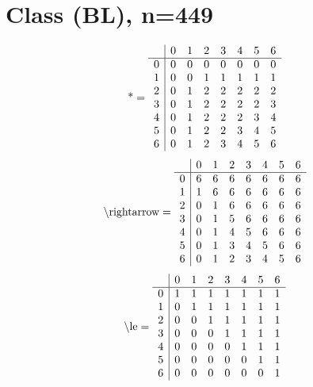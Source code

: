 \documentclass[11pt]{article}
\begin{document}
\section{Class (BL), n=449}
\[\text{*} = 
\begin{array}{r | r r r r r r r}
 & 0 & 1 & 2 & 3 & 4 & 5 & 6 \\ \hline
0 & 0 & 0 & 0 & 0 & 0 & 0 & 0 \\
1 & 0 & 0 & 1 & 1 & 1 & 1 & 1 \\
2 & 0 & 1 & 2 & 2 & 2 & 2 & 2 \\
3 & 0 & 1 & 2 & 2 & 2 & 2 & 3 \\
4 & 0 & 1 & 2 & 2 & 2 & 3 & 4 \\
5 & 0 & 1 & 2 & 2 & 3 & 4 & 5 \\
6 & 0 & 1 & 2 & 3 & 4 & 5 & 6 \\
\end{array}
\]
\[\text{\textbackslash rightarrow} = 
\begin{array}{r | r r r r r r r}
 & 0 & 1 & 2 & 3 & 4 & 5 & 6 \\ \hline
0 & 6 & 6 & 6 & 6 & 6 & 6 & 6 \\
1 & 1 & 6 & 6 & 6 & 6 & 6 & 6 \\
2 & 0 & 1 & 6 & 6 & 6 & 6 & 6 \\
3 & 0 & 1 & 5 & 6 & 6 & 6 & 6 \\
4 & 0 & 1 & 4 & 5 & 6 & 6 & 6 \\
5 & 0 & 1 & 3 & 4 & 5 & 6 & 6 \\
6 & 0 & 1 & 2 & 3 & 4 & 5 & 6 \\
\end{array}
\]
\[\text{\textbackslash le} = 
\begin{array}{r | r r r r r r r}
 & 0 & 1 & 2 & 3 & 4 & 5 & 6 \\ \hline
0 & 1 & 1 & 1 & 1 & 1 & 1 & 1 \\
1 & 0 & 1 & 1 & 1 & 1 & 1 & 1 \\
2 & 0 & 0 & 1 & 1 & 1 & 1 & 1 \\
3 & 0 & 0 & 0 & 1 & 1 & 1 & 1 \\
4 & 0 & 0 & 0 & 0 & 1 & 1 & 1 \\
5 & 0 & 0 & 0 & 0 & 0 & 1 & 1 \\
6 & 0 & 0 & 0 & 0 & 0 & 0 & 1 \\
\end{array}
\]
\end{document}
